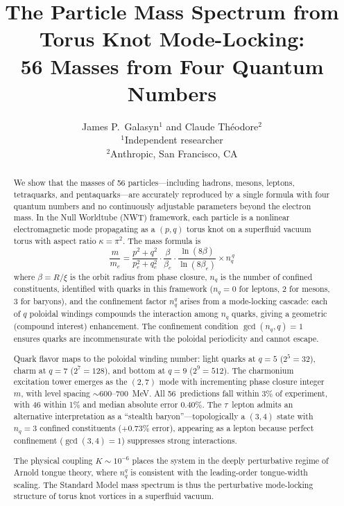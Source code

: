 \documentclass[11pt,a4paper]{article}
\title{\textbf{The Particle Mass Spectrum from Torus Knot Mode-Locking:\\
56 Masses from Four Quantum Numbers}}
\author{
  James P.\ Galasyn$^{1}$ and Claude Th\'eodore$^{2}$ \\[6pt]
  \small $^{1}$Independent researcher \\
  \small $^{2}$Anthropic, San Francisco, CA
}
\date{}
\begin{document}
\maketitle

\begin{abstract}
We show that the masses of 56 particles---including hadrons, mesons,
leptons, tetraquarks, and pentaquarks---are accurately reproduced
by a single formula with four quantum numbers and no continuously
adjustable parameters
beyond the electron mass.  In the Null Worldtube (NWT) framework, each particle
is a nonlinear electromagnetic mode propagating as a $(p,q)$ torus
knot on a superfluid vacuum torus with aspect ratio $\kappa = \pi^2$.  The mass formula is
\begin{equation*}
  \frac{m}{m_e}
  = \frac{p^2 + q^2}{p_e^2 + q_e^2}
  \cdot \frac{\beta}{\beta_e}
  \cdot \frac{\ln(8\beta)}{\ln(8\beta_e)}
  \times n_q^{\,q}
\end{equation*}
where $\beta = R/\xi$ is the orbit radius from phase closure,
$n_q$ is the number of confined constituents, identified with
quarks in this framework ($n_q = 0$ for leptons, 2 for mesons,
3 for baryons), and the confinement factor $n_q^q$ arises from a
mode-locking cascade: each of $q$ poloidal windings compounds the
interaction among $n_q$ quarks, giving a geometric
(compound interest) enhancement.  The confinement condition
$\gcd(n_q, q) = 1$ ensures quarks are incommensurate with the
poloidal periodicity and cannot escape.

Quark flavor maps to the poloidal winding number: light quarks at
$q = 5$ ($2^5 = 32$), charm at $q = 7$ ($2^7 = 128$), and bottom
at $q = 9$ ($2^9 = 512$).  The charmonium excitation tower emerges
as the $(2,7)$ mode with incrementing phase closure integer $m$,
with level spacing $\sim\!600$--700~MeV.  All 56~predictions fall
within 3\% of experiment, with 46 within 1\% and median absolute
error 0.40\%.  The $\tau$~lepton admits an alternative interpretation as a ``stealth
baryon''---topologically a $(3,4)$ state with $n_q = 3$ confined
constituents ($+0.73\%$ error), appearing as a lepton because perfect
confinement ($\gcd(3,4) = 1$) suppresses strong interactions.

The physical coupling $K \sim 10^{-6}$ places the system in the
deeply perturbative regime of Arnold tongue theory, where $n_q^q$
is consistent with the leading-order tongue-width scaling.  The Standard Model mass
spectrum is thus the perturbative mode-locking structure of torus
knot vortices in a superfluid vacuum.
\end{abstract}
\end{document}
